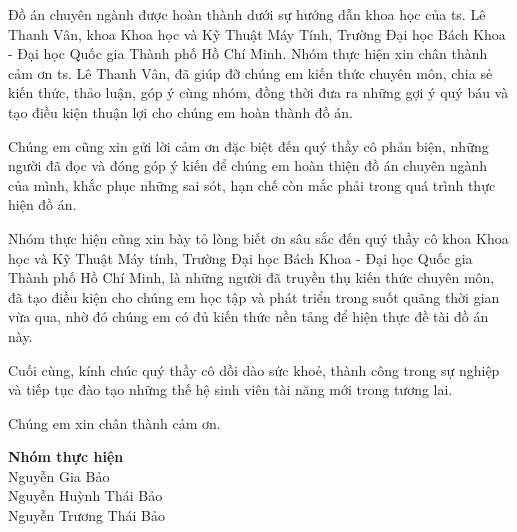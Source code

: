 Đồ án chuyên ngành được hoàn thành dưới sự hướng dẫn khoa học của \acrshort{ts}. Lê Thanh Vân, khoa Khoa học và Kỹ Thuật Máy Tính, Trường Đại học Bách Khoa - Đại học Quốc gia Thành phố Hồ Chí Minh. Nhóm thực hiện xin chân thành cảm ơn \acrshort{ts}. Lê Thanh Vân, đã giúp đỡ chúng em kiến thức chuyên môn, chia sẻ kiến thức, thảo luận, góp ý cùng nhóm, đồng thời đưa ra những gợi ý quý báu và tạo điều kiện thuận lợi cho chúng em hoàn thành đồ án.


Chúng em cũng xin gửi lời cảm ơn đặc biệt đến quý thầy cô phản biện, những người đã đọc và đóng góp ý kiến để chúng em hoàn thiện đồ án chuyên ngành của mình, khắc phục những sai sót, hạn chế còn mắc phải trong quá trình thực hiện đồ án.



Nhóm thực hiện cũng xin bày tỏ lòng biết ơn sâu sắc đến quý thầy cô khoa Khoa học và Kỹ Thuật Máy tính, Trường Đại học Bách Khoa - Đại học Quốc gia Thành phố Hồ Chí Minh, là những người đã truyền thụ kiến thức chuyên môn, đã tạo điều kiện cho chúng em học tập và phát triển trong suốt quãng thời gian vừa qua, nhờ đó chúng em có đủ kiến thức nền tảng để hiện thực đề tài đồ án này.

Cuối cùng, kính chúc quý thầy cô dồi dào sức khoẻ, thành công trong sự nghiệp và tiếp tục đào tạo những thế hệ sinh viên tài năng mới trong tương lai.


Chúng em xin chân thành cảm ơn.



\begin{flushright}
\textbf{Nhóm thực hiện}\\
Nguyễn Gia Bảo\\
Nguyễn Huỳnh Thái Bảo\\
Nguyễn Trương Thái Bảo\\
\end{flushright}